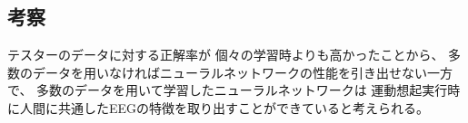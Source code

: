 \subsection{\mc 考察}
テスターのデータに対する正解率が
個々の学習時よりも高かったことから、
多数のデータを用いなければニューラルネットワークの性能を引き出せない一方で、
多数のデータを用いて学習したニューラルネットワークは
運動想起実行時に人間に共通したEEGの特徴を取り出すことができていると考えられる。


